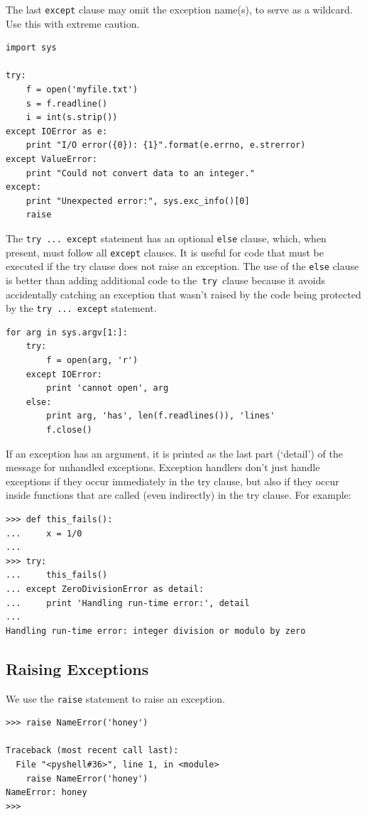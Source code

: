 \documentclass[12pt,a4paper]{article}
\begin{document}
The last \texttt{except} clause may omit the exception name(s), to serve as a wildcard. Use this with extreme caution.
\begin{verbatim}
import sys

try:
    f = open('myfile.txt')
    s = f.readline()
    i = int(s.strip())
except IOError as e:
    print "I/O error({0}): {1}".format(e.errno, e.strerror)
except ValueError:
    print "Could not convert data to an integer."
except:
    print "Unexpected error:", sys.exc_info()[0]
    raise
\end{verbatim}
The \texttt{try ... except} statement has an optional \texttt{else} clause, which, when present, must follow all \texttt{except} clauses. It is useful for code that must be executed if the try clause does not raise an exception. The use of the \texttt{else} clause is better than adding additional code to the\texttt{ try }clause because it avoids accidentally catching an exception that wasn’t raised by the code being protected by the \texttt{try ... except} statement.
\begin{verbatim}
for arg in sys.argv[1:]:
    try:
        f = open(arg, 'r')
    except IOError:
        print 'cannot open', arg
    else:
        print arg, 'has', len(f.readlines()), 'lines'
        f.close()
\end{verbatim}
If an exception has an argument, it is printed as the last part (‘detail’) of the message for unhandled exceptions.
Exception handlers don’t just handle exceptions if they occur immediately in the try clause, but also if they occur inside functions that are called (even indirectly) in the try clause. For example:
\begin{verbatim}
>>> def this_fails():
...     x = 1/0
...
>>> try:
...     this_fails()
... except ZeroDivisionError as detail:
...     print 'Handling run-time error:', detail
...
Handling run-time error: integer division or modulo by zero
\end{verbatim}

\subsection{Raising Exceptions}
We use the \texttt{raise} statement to raise an exception. 
\begin{verbatim}
>>> raise NameError('honey')

Traceback (most recent call last):
  File "<pyshell#36>", line 1, in <module>
    raise NameError('honey')
NameError: honey
>>> 
\end{verbatim}
\end{document}
